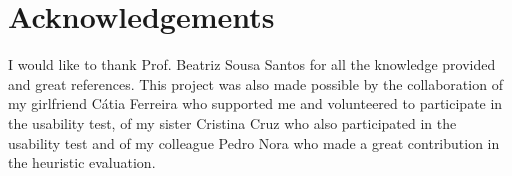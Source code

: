 \documentclass[a4paper]{article}
\begin{document}
\section*{Acknowledgements}
I would like to thank Prof. Beatriz Sousa Santos for all the knowledge provided and great references. This project was also made possible by the collaboration of my girlfriend Cátia Ferreira who supported me and volunteered to participate in the usability test, of my sister Cristina Cruz who also participated in the usability test and of my colleague Pedro Nora who made a great contribution in the heuristic evaluation.

\appendix












\end{document}
